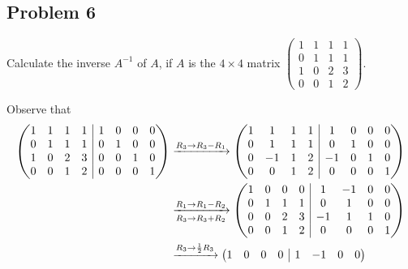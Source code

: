 \documentclass[main.tex]{subfiles}
\begin{document}
\eject

\subsection{Problem 6}
\begin{claim}
    Calculate the inverse $A^{-1}$ of $A$, if $A$ is the $4 \times 4$ matrix $\begin{pmatrix}
        1 & 1 & 1 & 1 \\
        0 & 1 & 1 & 1 \\
        1 & 0 & 2 & 3 \\
        0 & 0 & 1 & 2
    \end{pmatrix}$.
\end{claim}

\begin{soln}
    Observe that
    \begin{align*}
        \parens{\begin{array}{@{}c c c c | c c c c@{}}
            1 & 1 & 1 & 1 & 1 & 0 & 0 & 0 \\
            0 & 1 & 1 & 1 & 0 & 1 & 0 & 0 \\
            1 & 0 & 2 & 3 & 0 & 0 & 1 & 0 \\
            0 & 0 & 1 & 2 & 0 & 0 & 0 & 1
        \end{array}} &\xrightarrow{R_3\to R_3 - R_1}
        \parens{\begin{array}{@{}c c c c | c c c c@{}}
            1 & 1 & 1 & 1 & 1 & 0 & 0 & 0 \\
            0 & 1 & 1 & 1 & 0 & 1 & 0 & 0 \\
            0 & -1 & 1 & 2 & -1 & 0 & 1 & 0 \\
            0 & 0 & 1 & 2 & 0 & 0 & 0 & 1
        \end{array}} \\
        &\xrightarrow[R_3\to R_3 + R_2]{R_1\to R_1 - R_2}
        \parens{\begin{array}{@{}c c c c | c c c c@{}}
            1 & 0 & 0 & 0 & 1 & -1 & 0 & 0 \\
            0 & 1 & 1 & 1 & 0 & 1 & 0 & 0 \\
            0 & 0 & 2 & 3 & -1 & 1 & 1 & 0 \\
            0 & 0 & 1 & 2 & 0 & 0 & 0 & 1
        \end{array}} \\
        &\xrightarrow{R_3\to \frac{1}{2}R_3}
        \parens{\begin{array}{@{}c c c c | c c c c@{}}
            1 & 0 & 0 & 0 & 1 & -1 & 0 & 0 \\

\end{array}}
\end{align*}
\end{soln}
\end{document}
